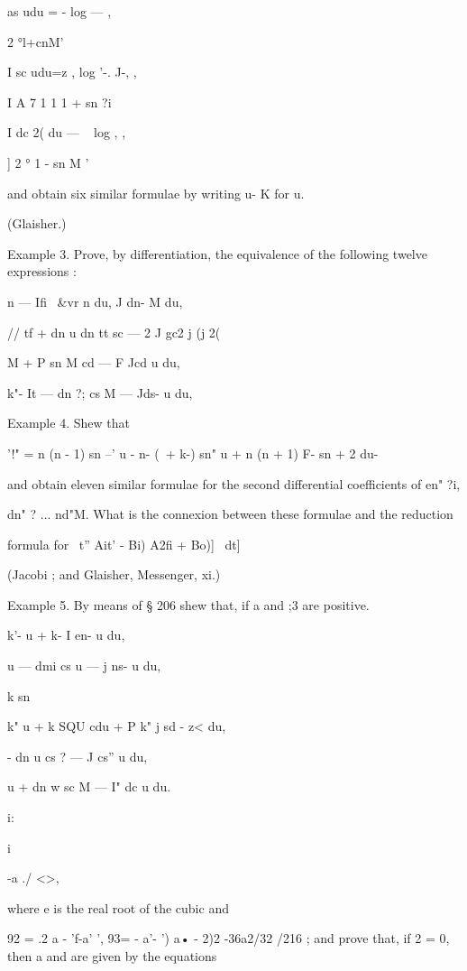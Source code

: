 as udu = - log — , 

2 °l+cnM' 



I sc udu=z , log '-. J-, , 

I A 7 1 1 1 + sn ?i 

I dc 2( du — ~ log , , 

] 2 ° 1 - sn M ' 

and obtain six similar formulae by writing u- K for u. 

(Glaisher.) 

Example 3. Prove, by differentiation, the equivalence of the following twelve 
expressions : 

n — Ifi \  \&vr n du, 
J dn- M du, 

// tf + dn u%
dn tt sc   —  2 J gc2 j  (j 2(  

M + P sn M cd   — F Jcd  u du, 

k"- It — dn ?; cs M — Jds- u du, 

Example 4. Shew that 

'!"   = n (n - 1) sn --' u - n- (\ + k-) sn" u + n (n + 1) F- sn  + 2   
du- 

and obtain eleven similar formulae for the second differential coefficients of en" ?i, 

dn" ?  ... nd"M. What is the connexion between these formulae and the reduction 

formula for \ t''  Ait' - Bi) A2fi + Bo)]~  dt] 

(Jacobi ; and Glaisher, Messenger, xi.) 

Example 5. By means of § 206 shew that, if a and ;3 are positive. 



k'- u + k- I en- u du, 

u — dmi cs u — j ns- u du, 

k  sn %

k"  u + k  SQU cdu + P k"  j sd - z< du, 

- dn u cs ?  — J cs'' u du, 

u + dn w sc M — I" dc  u du. 



i: 



 i 



-a ./ <>, 

where e  is the real root of the cubic and 

92 =  .2  a - 'f-a' ', 93= - a'-  ')   a• - 2)2 -36a2/32 /216 ; 
and prove that, if  2 = 0, then a and   are given by the equations 

